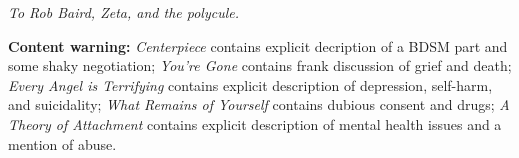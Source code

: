 \null

\vfill

\begin{flushright}
    \emph{To Rob Baird, Zeta, and the polycule.}
\end{flushright}

\vfill

\noindent \textbf{Content warning:} \emph{Centerpiece} contains explicit decription of a BDSM part and some shaky negotiation; \emph{You're Gone} contains frank discussion of grief and death; \emph{Every Angel is Terrifying} contains explicit description of depression, self-harm, and suicidality; \emph{What Remains of Yourself} contains dubious consent and drugs; \emph{A Theory of Attachment} contains explicit description of mental health issues and a mention of abuse.
